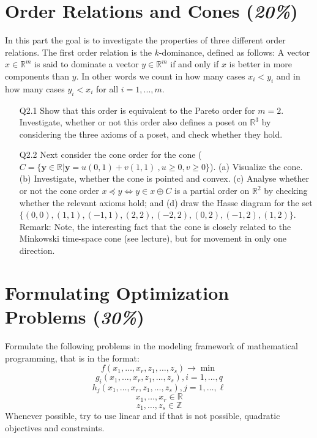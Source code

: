 \documentclass{article}
\newcommand{\R}{\mathbb{R}}
\begin{document}
\newpage    
\section{Order Relations and Cones (\textit{20\%})}
In this part the goal is to investigate the properties of three different order relations. 
The first order relation is the $k$-dominance, defined as follows:
A vector $x \in \R^m$ is said to dominate a vector $y \in \R^m$ if and only if $x$ is better in more components than $y$. In other words we count in how many cases $x_i < y_i$ and in how many cases $y_i < x_i$ for all $i=1, ..., m$.
\begin{itemize}
	\item[Q2.1] Show that this order is equivalent to the Pareto order for $m=2$. Investigate, whether or not this order also defines a poset on $\R^3$ by considering the three axioms of a poset, and check whether they hold. 
	\item[Q2.2] Next consider the cone order for the cone ($C=\{\mathbf{y} \in \mathbb{R}| \mathbf{y} = u (0,1) + v (1,1) \ , u\geq 0, v\geq 0\}$). (a) Visualize the cone. (b) Investigate, whether the cone is pointed and convex. (c) Analyse whether or not the cone order  $x \preceq y \Leftrightarrow y \in x \oplus C$ is a partial order on $\mathbb{R}^2$ by checking whether the relevant axioms hold; and (d) draw the Hasse diagram for the set $\{(0,0), (1,1), (-1,1), (2,2), (-2,2), (0,2), (-1,2), (1,2)\}$.
	Remark: Note, the interesting fact that the cone is closely related to the Minkowski time-space cone (see lecture), but for movement in only one direction. 
\end{itemize}
\newpage
\section{Formulating Optimization Problems (\textit{30\%})}
Formulate the following problems in the modeling framework of mathematical programming, that is in the format:
$$f(x_1, \dots, x_r, z_1, \dots, z_s) \rightarrow \min$$
$$g_i (x_1, \dots, x_r, z_1, \dots, z_s), i=1, \dots, q$$
$$h_j (x_1, \dots, x_r, z_1, \dots, z_s), j=1, \dots, \ell$$
$$x_1, \dots, x_r\in \mathbb{R}$$
$$z_1, \dots, z_s\in \mathbb{Z}$$
Whenever possible, try to use linear and if that is not possible, quadratic objectives and constraints.
\end{document}
